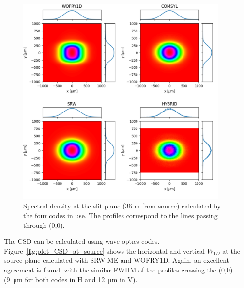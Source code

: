 \documentclass{iucr}              %
\begin{document}
\begin{figure}
    \label{fig:plot_2D_spectral_density_36m}
    \includegraphics[width=0.95\textwidth]{figures/plot_2D_spectral_density_36m.pdf}
    \caption{Spectral density at the slit plane (36 m from source) calculated by the four codes in use. The profiles correspond to the lines passing through (0,0).
    }
\end{figure}

The CSD can be calculated using wave optics codes. 
Figure~\ref{fig:plot_CSD_at_source} shows the horizontal and vertical $W_{1D}$ at the source plane calculated with SRW-ME and WOFRY1D.
Again, an excellent agreement is found, with the similar FWHM of the profiles crossing the (0,0) (\SI{9}{\micro\meter} for both codes in H and \SI{12}{\micro\meter} in V).
\end{document}
